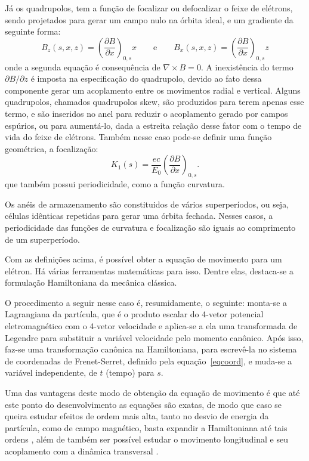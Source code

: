 Já os quadrupolos, tem a função de focalizar ou defocalizar o feixe de elétrons, sendo projetados para gerar um campo nulo na órbita ideal, e um gradiente da seguinte forma:
\begin{equation}
 B_z(s,x,z)=\left(\frac{\partial B}{\partial x}\right)_{0,s}x \qquad \mathrm{e}
\qquad B_x(s,x,z)=\left(\frac{\partial B}{\partial x}\right)_{0,s}z
\end{equation}
onde a segunda equação é consequência de $\nabla \times B = 0$. A inexistência do termo $\partial B / \partial z$ é imposta na especificação do quadrupolo, devido ao fato dessa componente gerar um acoplamento entre os movimentos radial e vertical.
Alguns quadrupolos, chamados quadrupolos skew, são produzidos para terem apenas esse termo, e são inseridos no anel para reduzir o acoplamento gerado por campos espúrios, ou para aumentá-lo, dada a estreita relação desse fator com o tempo de vida do feixe de elétrons.
Também nesse caso pode-se definir uma função geométrica, a focalização:
\begin{equation}
  K_1(s)=\frac{ec}{E_0}\left(\frac{\partial B}{\partial x}\right)_{0,s}.
\end{equation}
que também possui periodicidade, como a função curvatura.

Os anéis de armazenamento são constituidos de vários superperíodos, ou seja, células idênticas repetidas para gerar uma órbita fechada. Nesses casos, a periodicidade das funções de curvatura e focalização são iguais ao comprimento de um superperíodo.

Com as definições acima, é possível obter a equação de movimento para um elétron. Há várias ferramentas matemáticas para isso. Dentre elas, destaca-se a formulação Hamiltoniana da mecânica clássica.

O procedimento a seguir nesse caso é, resumidamente, o seguinte: monta-se a Lagrangiana da partícula, que é o produto escalar do 4-vetor potencial eletromagnético com o 4-vetor velocidade e aplica-se a ela uma transformada de Legendre para substituir a variável velocidade pelo momento canônico. Após isso, faz-se uma transformação canônica na Hamiltoniana, para escrevê-la no sistema de coordenadas de Frenet-Serret, definido pela \mbox{equação~\eqref{eqcoord}}, e muda-se a variável independente, de $t$
(tempo)
para $s$. 

Uma das vantagens deste modo de obtenção da equação de movimento é que até este ponto do desenvolvimento as equações são exatas, de modo que caso se queira estudar efeitos de ordem mais alta, tanto no desvio de energia da partícula, como de campo magnético, basta expandir a Hamiltoniana até tais ordens \cite{Wiedemann2 II}, além de também ser possível estudar o movimento longitudinal e seu acoplamento com a dinâmica transversal \cite{Lee}.

